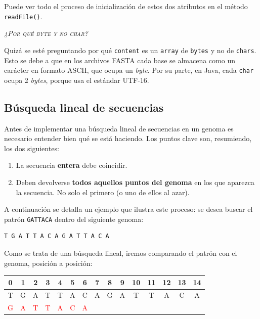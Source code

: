 \documentclass[10pt,a4paper,spanish]{article}
\newcommand{\sombreado}[2]{
  \begin{shaded}
    \begin{center} \emph{\textsc{#1}} \end{center}
    \noindent #2\\
  \end{shaded}
}
\newcommand{\code}[1]{\texttt{#1}}
\begin{document}
Puede ver todo el proceso de inicialización de estos dos atributos en el método \code{readFile()}.

\sombreado{¿Por qué byte y no char?}{Quizá se esté preguntando por qué \code{content} es un \code{array} de \code{bytes} y no de \code{chars}. Esto se debe a que en los archivos FASTA cada base se almacena como un carácter en formato ASCII, que ocupa un \textit{byte}. Por su parte, en Java, cada \code{char} ocupa 2 \textit{bytes}, porque usa el estándar UTF-16.}

\subsection{Búsqueda lineal de secuencias}

Antes de implementar una búsqueda lineal de secuencias en un genoma es necesario entender bien qué se está haciendo. Los puntos clave son, resumiendo, los dos siguientes:

\begin{enumerate}
    \item La secuencia \textbf{entera} debe coincidir.
    \item Deben devolverse \textbf{todos aquellos puntos del genoma} en los que aparezca la secuencia. No solo el primero (o uno de ellos al azar).
\end{enumerate}

A continuación se detalla un ejemplo que ilustra este proceso: se desea buscar el patrón \code{GATTACA} dentro del siguiente genoma:

\begin{center}
\begin{verbatim}
T G A T T A C A G A T T A C A
\end{verbatim}
\end{center}

Como se trata de una búsqueda lineal, iremos comparando el patrón con el genoma, posición a posición:

\newcommand{\red}[1]{\textcolor{red}{#1}}
\newcommand{\blue}[1]{\textcolor{blue}{#1}}

\begin{center}
\begin{tabular}{|*{15}{c|}}
\hline
0 & 1 & 2 & 3 & 4 & 5 & 6 & 7 & 8 & 9 & 10 & 11 & 12 & 13 & 14 \\
\hline
T & G & A & T & T & A & C & A & G & A & T & T & A & C & A \\
\hline
\red{G} & \red{A} & \red{T} & \red{T} & \red{A} & \red{C} & \red{A} & & & & & & & & \\
\hline
\end{tabular}
\end{center}
\end{document}
